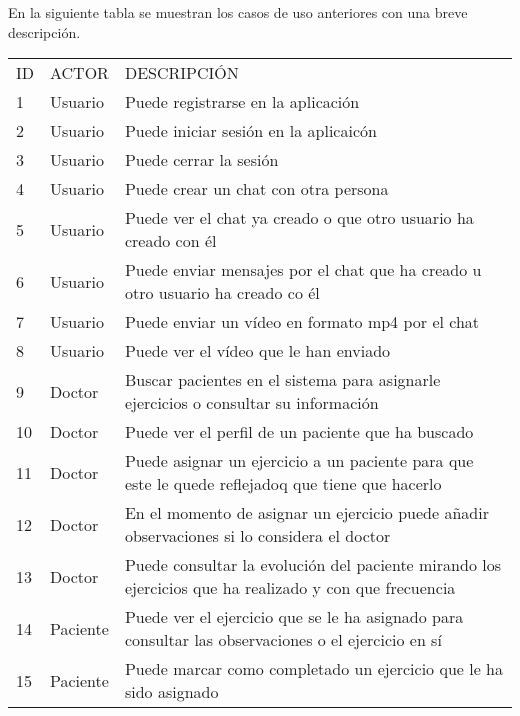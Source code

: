 \medskip
En la siguiente tabla se muestran los casos de uso anteriores con una breve descripción.

\begin{tabular}{|| lll ||}
    ID & ACTOR    & DESCRIPCIÓN \\
    1  & Usuario  & Puede registrarse en la aplicación \\
    2  & Usuario  & Puede iniciar sesión en la aplicaicón \\
    3  & Usuario  & Puede cerrar la sesión \\
    4  & Usuario  & Puede crear un chat con otra persona \\
    5  & Usuario  & Puede ver el chat ya creado o que otro usuario ha creado con él \\
    6  & Usuario  & Puede enviar mensajes por el chat que ha creado u otro usuario ha creado co él \\
    7  & Usuario  & Puede enviar un vídeo en formato mp4 por el chat \\
    8  & Usuario  & Puede ver el vídeo que le han enviado \\
    9  & Doctor   & Buscar pacientes en el sistema para asignarle ejercicios o consultar su información \\
    10 & Doctor   & Puede ver el perfil de un paciente que ha buscado \\
    11 & Doctor   & Puede asignar un ejercicio a un paciente para que este le quede reflejadoq que tiene que hacerlo \\
    12 & Doctor   & En el momento de asignar un ejercicio puede añadir observaciones si lo considera el doctor \\
    13 & Doctor   & Puede consultar la evolución del paciente mirando los ejercicios que ha realizado y con que frecuencia \\
    14 & Paciente & Puede ver el ejercicio que se le ha asignado para consultar las observaciones o el ejercicio en sí \\
    15 & Paciente & Puede marcar como completado un ejercicio que le ha sido asignado \\
\end{tabular}




